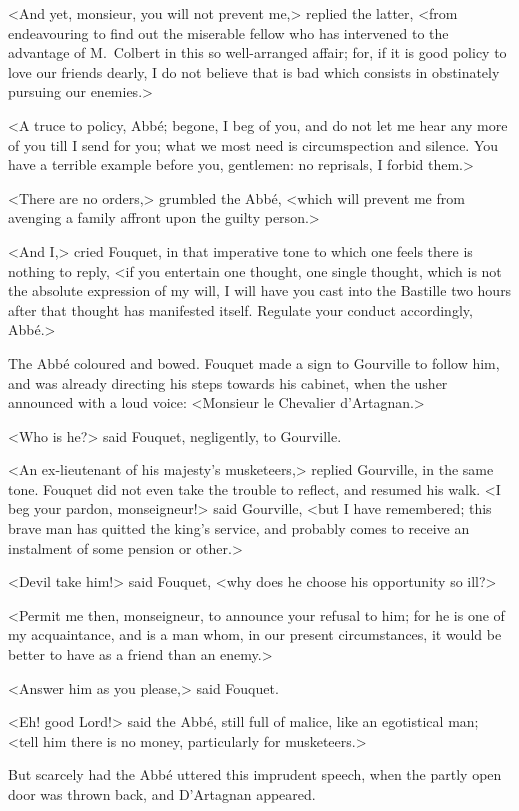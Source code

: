 <And yet, monsieur, you will not prevent me,> replied the latter, <from endeavouring to find out the miserable fellow who has intervened to the advantage of M.~Colbert in this so well-arranged affair; for, if it is good policy to love our friends dearly, I do not believe that is bad which consists in obstinately pursuing our enemies.>

<A truce to policy, Abbé; begone, I beg of you, and do not let me hear any more of you till I send for you; what we most need is circumspection and silence. You have a terrible example before you, gentlemen: no reprisals, I forbid them.>

<There are no orders,> grumbled the Abbé, <which will prevent me from avenging a family affront upon the guilty person.>

<And I,> cried Fouquet, in that imperative tone to which one feels there is nothing to reply, <if you entertain one thought, one single thought, which is not the absolute expression of my will, I will have you cast into the Bastille two hours after that thought has manifested itself. Regulate your conduct accordingly, Abbé.>

The Abbé coloured and bowed. Fouquet made a sign to Gourville to follow him, and was already directing his steps towards his cabinet, when the usher announced with a loud voice: <Monsieur le Chevalier d'Artagnan.>

<Who is he?> said Fouquet, negligently, to Gourville.

<An ex-lieutenant of his majesty's musketeers,> replied Gourville, in the same tone. Fouquet did not even take the trouble to reflect, and resumed his walk. <I beg your pardon, monseigneur!> said Gourville, <but I have remembered; this brave man has quitted the king's service, and probably comes to receive an instalment of some pension or other.>

<Devil take him!> said Fouquet, <why does he choose his opportunity so ill?>

<Permit me then, monseigneur, to announce your refusal to him; for he is one of my acquaintance, and is a man whom, in our present circumstances, it would be better to have as a friend than an enemy.>

<Answer him as you please,> said Fouquet.

<Eh! good Lord!> said the Abbé, still full of malice, like an egotistical man; <tell him there is no money, particularly for musketeers.>

But scarcely had the Abbé uttered this imprudent speech, when the partly open door was thrown back, and D'Artagnan appeared.

